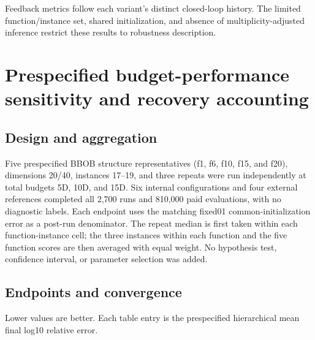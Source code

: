 \documentclass[cmc,article,submit,moreauthors,pdftex]{Definitions/tsp}
\begin{document}
Feedback metrics follow each variant's distinct closed-loop history. The limited function/instance set, shared initialization, and absence of multiplicity-adjusted inference restrict these results to robustness description.

\hypertarget{prespecified-budget-performance-sensitivity-and-recovery-accounting}{%
\section{Prespecified budget-performance sensitivity and recovery accounting}\label{prespecified-budget-performance-sensitivity-and-recovery-accounting}}

\hypertarget{design-and-aggregation}{%
\subsection{Design and aggregation}\label{design-and-aggregation}}

Five prespecified BBOB structure representatives (f1, f6, f10, f15, and f20), dimensions 20/40, instances 17--19, and three repeats were run independently at total budgets 5D, 10D, and 15D. Six internal configurations and four external references completed all 2,700 runs and 810,000 paid evaluations, with no diagnostic labels. Each endpoint uses the matching fixed01 common-initialization error as a post-run denominator. The repeat median is first taken within each function-instance cell; the three instances within each function and the five function scores are then averaged with equal weight. No hypothesis test, confidence interval, or parameter selection was added.

\hypertarget{endpoints-and-convergence-1}{%
\subsection{Endpoints and convergence}\label{endpoints-and-convergence-1}}

Lower values are better. Each table entry is the prespecified hierarchical mean final log10 relative error.
\end{document}
